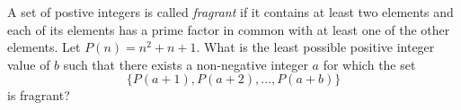 A set of postive integers is called \emph{fragrant}
 if it contains at least two elements and each of its elements has a prime factor in common with at least one of the other elements.  Let 
$P(n)=n^2+n+1$. 
  What is the least possible positive integer value of 
$b$
 such that there exists a non-negative integer 
$a$
 for which the set 
$$\{P(a+1),P(a+2),\ldots,P(a+b)\}$$
is fragrant?
